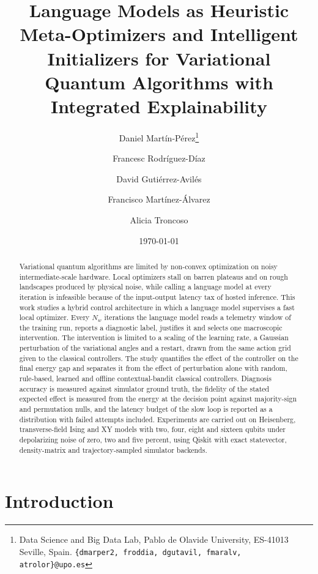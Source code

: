 \documentclass[11pt,a4paper]{article}
\title{Language Models as Heuristic Meta-Optimizers and Intelligent Initializers for Variational Quantum Algorithms with Integrated Explainability}
\author{Daniel Mart\'in-P\'erez\thanks{Data Science and Big Data Lab, Pablo de Olavide University, ES-41013 Seville, Spain. \texttt{\{dmarper2, froddia, dgutavil, fmaralv, atrolor\}@upo.es}} \and
Francesc Rodr\'iguez-D\'iaz \and
David Guti\'errez-Avil\'es \and
Francisco Mart\'inez-\'Alvarez \and
Alicia Troncoso}
\date{\today}
\begin{document}
\maketitle

\begin{abstract}
Variational quantum algorithms are limited by non-convex optimization on noisy intermediate-scale hardware. Local optimizers stall on barren plateaus and on rough landscapes produced by physical noise, while calling a language model at every iteration is infeasible because of the input-output latency tax of hosted inference. This work studies a hybrid control architecture in which a language model supervises a fast local optimizer. Every $N_w$ iterations the language model reads a telemetry window of the training run, reports a diagnostic label, justifies it and selects one macroscopic intervention. The intervention is limited to a scaling of the learning rate, a Gaussian perturbation of the variational angles and a restart, drawn from the same action grid given to the classical controllers. The study quantifies the effect of the controller on the final energy gap and separates it from the effect of perturbation alone with random, rule-based, learned and offline contextual-bandit classical controllers. Diagnosis accuracy is measured against simulator ground truth, the fidelity of the stated expected effect is measured from the energy at the decision point against majority-sign and permutation nulls, and the latency budget of the slow loop is reported as a distribution with failed attempts included. Experiments are carried out on Heisenberg, transverse-field Ising and XY models with two, four, eight and sixteen qubits under depolarizing noise of zero, two and five percent, using Qiskit with exact statevector, density-matrix and trajectory-sampled simulator backends.
\end{abstract}

\section{Introduction}
\end{document}
